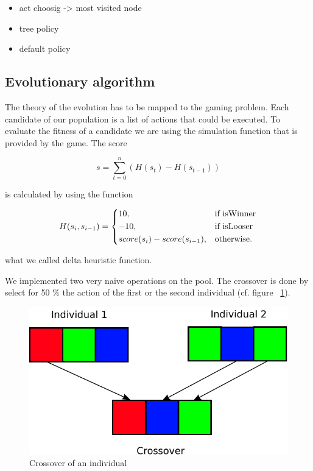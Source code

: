 \begin{itemize}
  \item act choosig -> most visited node
  \item tree policy
  \item default policy
\end{itemize}



\subsection{Evolutionary algorithm} 

The theory of the evolution has to be mapped to the gaming problem. Each candidate of our population is
a list of actions that could be executed. To evaluate the fitness of a candidate we are using the
simulation function that is provided by the game. 
The score

\begin{equation}
s = \sum_{t=0}^n (H(s_t) - H(s_{t-1}))
\end{equation}

is calculated by using the function

\begin{equation}
    H(s_i, s_{i-1}) = 
\begin{dcases}
    10, & \text{if isWinner}  \\
    -10, & \text{if isLooser}  \\
    score(s_i) - score(s_{i-1}), & \text{otherwise.}
\end{dcases}
\end{equation}

what we called delta heuristic function.

We implemented two very naive operations on the pool. The crossover is done by
select for 50 \% the action of the first or the second individual (cf. figure ~\ref{fig:crossover}).

\begin{figure}[H]
\centering
\includegraphics[scale=0.6]{images/crossover.pdf}
\caption{Crossover of an individual}
\label{fig:crossover}
\end{figure}

